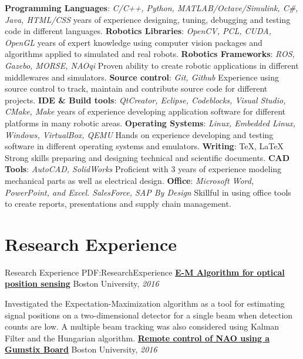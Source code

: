 \documentclass[letterpaper,MMMyyyy,nonstop]{simpleresumecv}
\begin{document}
\begin{body}
\GapNoBreak
\BulletItem
\textbf{Programming Languages}: \textit{C/C++, Python, MATLAB/Octave/Simulink, C\#, Java, HTML/CSS}
 years of experience designing, tuning, debugging and testing code in different languages.
\BulletItem
\textbf{Robotics Libraries}: \textit{OpenCV, PCL, CUDA, OpenGL}
 years of expert knowledge using computer vision packages and algorithms applied to simulated and real robots.
\BulletItem
\textbf{Robotics Frameworks}: \textit{ROS, Gazebo, MORSE, NAOqi}
\SubBulletItem
Proven ability to create robotic applications in different middlewares and simulators.
\BulletItem
\textbf{Source control}: \textit{Git, Github}
\SubBulletItem
Experience using source control to track, maintain and contribute source code for different projects.
\BulletItem
\textbf{IDE \& Build tools}: \textit{QtCreator, Eclipse, Codeblocks, Visual Studio, CMake, Make}
 years of experience developing application software for different platforms in many robotic areas.
\BulletItem
\textbf{Operating Systems}: \textit{Linux, Embedded Linux, Windows, VirtualBox, QEMU}
\SubBulletItem
Hands on experience developing and testing software in different operating systems and emulators.
\BulletItem
\textbf{Writing}: {\TeX}, {\LaTeX}
\SubBulletItem
Strong skills preparing and designing technical and scientific documents.
\BulletItem
\textbf{CAD Tools}: \textit{AutoCAD, SolidWorks}
\SubBulletItem
Proficient with 3 years of experience modeling mechanical parts as well as electrical design.
\BulletItem
\textbf{Office}: \textit{Microsoft Word, PowerPoint, and Excel. SalesForce, SAP By Design}
\SubBulletItem
Skillful in using office tools to create reports, presentations and supply chain management.


\section
{Research Experience}
{Research Experience}
{PDF:ResearchExperience}
\href{https://github.com/davidlavy88/EMOpticalSensing/blob/master/EC503_EM_Optical_Sensing_Final_Report.pdf}
{\textbf{E-M Algorithm for optical position sensing}}
\hfill
Boston University, \textit{2016}

\GapNoBreak
\BulletItem
Investigated the Expectation-Maximization algorithm as a tool for estimating signal positions on a two-dimensional detector for a single beam when detection counts are low. A multiple beam tracking was also considered using Kalman Filter and the Hungarian algorithm.
\GapNoBreak
\href{https://github.com/davidlavy88/NAOGumstix/blob/master/ec535FinalReport.pdf}
{\textbf{Remote control of NAO using a Gumstix Board}}
\hfill
Boston University, \textit{2016}


\end{body}
\end{document}
